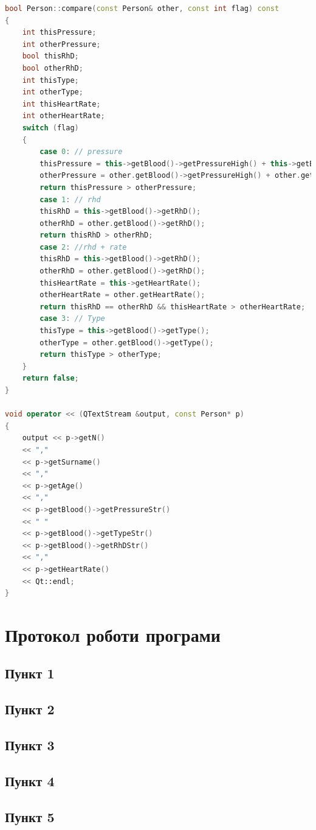 \documentclass[oneside,14pt]{extarticle}
\begin{document}
\begin{small}
\begin{lstlisting}[language=c++]
bool Person::compare(const Person& other, const int flag) const
{
	int thisPressure;
	int otherPressure;
	bool thisRhD;
	bool otherRhD;
	int thisType;
	int otherType;
	int thisHeartRate;
	int otherHeartRate;
	switch (flag)
	{
		case 0: // pressure
		thisPressure = this->getBlood()->getPressureHigh() + this->getBlood()->getPressureLow();
		otherPressure = other.getBlood()->getPressureHigh() + other.getBlood()->getPressureLow();
		return thisPressure > otherPressure;
		case 1: // rhd
		thisRhD = this->getBlood()->getRhD();
		otherRhD = other.getBlood()->getRhD();
		return thisRhD > otherRhD;
		case 2: //rhd + rate
		thisRhD = this->getBlood()->getRhD();
		otherRhD = other.getBlood()->getRhD();
		thisHeartRate = this->getHeartRate();
		otherHeartRate = other.getHeartRate();
		return thisRhD == otherRhD && thisHeartRate > otherHeartRate;
		case 3: // Type
		thisType = this->getBlood()->getType();
		otherType = other.getBlood()->getType();
		return thisType > otherType;
	}
	return false;
}

void operator << (QTextStream &output, const Person* p)
{
	output << p->getN()
	<< ","
	<< p->getSurname()
	<< ","
	<< p->getAge()
	<< ","
	<< p->getBlood()->getPressureStr()
	<< " "
	<< p->getBlood()->getTypeStr()
	<< p->getBlood()->getRhDStr()
	<< ","
	<< p->getHeartRate()
	<< Qt::endl;
}

\end{lstlisting}
\end{small}

\section{Протокол роботи програми}
\subsection{Пункт 1}
\subsection{Пункт 2}
\subsection{Пункт 3}
\subsection{Пункт 4}
\subsection{Пункт 5}
\end{document}
